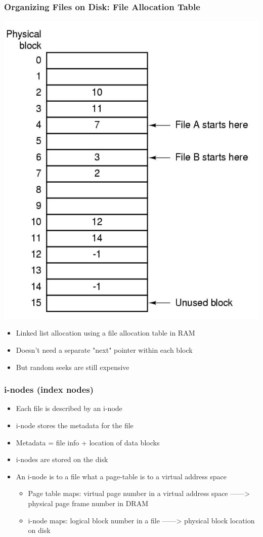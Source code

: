 \documentclass[12pt]{article}
\begin{document}
\subsubsection{Organizing Files on Disk: File Allocation Table}
\includegraphics[width=\textwidth]{FileAllocationTable.png}
\begin{itemize}
    \item Linked list allocation using a file allocation table in RAM 
    \item Doesn’t need a separate "next" pointer within each block 
    \item But random seeks are still expensive
\end{itemize}
\subsubsection{i-nodes (index nodes)}
\begin{itemize}
    \item Each file is described by an i-node 
    \item i-node stores the metadata for the file 
    \item Metadata = file info + location of data blocks 
    \item i-nodes are stored on the disk 
    \item An i-node is to a file what a page-table is to a virtual address space \begin{itemize}
        \item Page table maps: virtual page number in a virtual address space ——> physical page frame number in DRAM 
        \item i-node maps: logical block number in a file ——> physical block location on disk
    \end{itemize}
\end{itemize}
\end{document}
